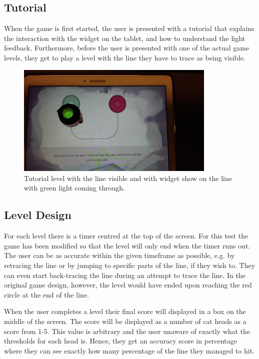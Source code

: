 \subsection*{Tutorial}
When the game is first started, the user is presented with a tutorial that explains the interaction with the widget on the tablet, and how to understand the light feedback. Furthermore, before the user is presented with one of the actual game levels, they get to play a level with the line they have to trace as being visible.

\begin{figure}[!h]
\includegraphics[width=0.85\textwidth]{img/tut}
\caption{Tutorial level with the line visible and with widget show on the line with green light coming through.}
\end{figure}

\subsection*{Level Design}
For each level there is a timer centred at the top of the screen. For this test the game has been modified so that the level will only end when the timer runs out. The user can be as accurate within the given timeframe as possible, e.g. by retracing the line or by jumping to specific parts of the line, if they wish to. They can even start back-tracing the line during an attempt to trace the line. In the original game design, however, the level would have ended upon reaching the red circle at the end of the line.

When the user completes a level their final score will displayed in a box on the middle of the screen. The score will be displayed as a number of cat heads as a score from 1-5. This value is arbitrary and the user unaware of exactly what the thresholds for each head is. Hence, they get an accuracy score in percentage where they can see exactly how many percentage of the line they managed to hit. 

